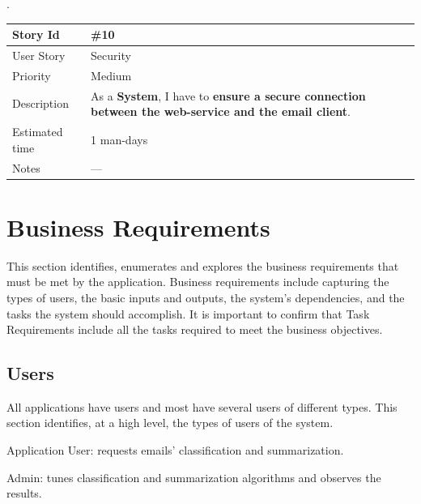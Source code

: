 .\\

\begin{tabular}{|p{3cm}|p{10cm}|}
\hline
\cellcolor[gray]{0.9} Story Id & \#10 \\ \hline
\cellcolor[gray]{0.9} User Story & Security \\ \hline
\cellcolor[gray]{0.9} Priority & Medium \\ \hline
\cellcolor[gray]{0.9} Description & 
	As a \textbf{System}, I have to \textbf{ensure a 
	secure connection between the web-service and the email client}. \\ \hline
\cellcolor[gray]{0.9} Estimated time & 1 man-days\\ \hline
\cellcolor[gray]{0.9} Notes & --- \\ \hline
\end{tabular}

\newpage
\section{Business Requirements}

This section identifies, enumerates and explores the business requirements that must 
be met by the application. Business requirements include capturing the types of users, 
the basic inputs and outputs, the system's dependencies, and the tasks the system should 
accomplish. It is important to confirm that Task Requirements include all the tasks 
required to meet the business objectives.

\subsection{Users}
All applications have users and most have several users of different types. This 
section identifies, at a high level, the types of users of the system.

\begin{my_enumerate}
  \item Application User: requests emails' classification and summarization.
  \item Admin: tunes classification and summarization algorithms and observes the results.
\end{my_enumerate}

